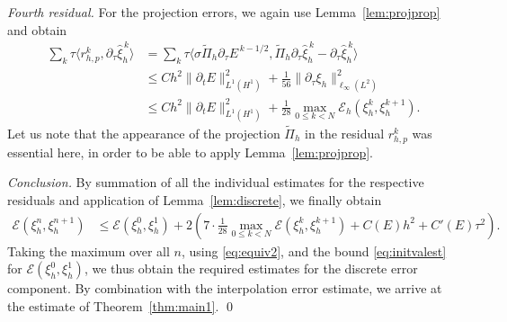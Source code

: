 \documentclass[12pt,reqno,a4paper]{amsart}
\theoremstyle{definition}
\def\EE{\mathscr{E}}
\def\dtau{\partial_{\tau}}
\def\dt{\partial_{t}}
\def\wPi{\widetilde\Pi}
\def\r{{r}}
\def\wh{\widehat}
\def\la{\langle}
\def\ra{\rangle}
\begin{document}
\medskip 
\noindent 
\textit{Fourth residual.}
For the projection errors, we again use Lemma~\ref{lem:projprop} and obtain
\begin{align*}
\sum\nolimits_k\tau\la\r_{h,p}^k,\dtau\wh\xi_h^{\,k}\ra
&= \sum\nolimits_k \tau \la\sigma \wPi_h \dtau E^{\,k-1/2},\wPi_h\dtau\wh\xi_h^{\,k}-\dtau\wh\xi_h^{\,k}\ra \\
&\le C h^2\|\dt E\|_{L^1(H^1)}^2 + \tfrac{1}{56}\|\dtau\xi_h\|^2_{\ell_\infty(L^2)} \\
&\le C h^2\|\dt E\|_{L^1(H^1)}^2 + \tfrac{1}{28}\max_{0\le k<N} \EE_h(\xi_h^k,\xi_h^{k+1}).
\end{align*}
Let us note that the appearance of the projection $\wPi_h$ in the residual $r_{h,p}^k$ was essential here, in order to be able to apply Lemma~\ref{lem:projprop}.

\medskip 
\noindent 
\textit{Conclusion.}
By summation of all the individual estimates for the respective residuals and application of Lemma~\ref{lem:discrete}, we finally obtain
\begin{align*}
\EE(\xi_h^n,\xi_h^{n+1})&\le \EE(\xi_h^0,\xi_h^{1}) + 2\left(7\cdot \tfrac{1}{28} \max_{0\le k < N} \EE(\xi_h^k,\xi_h^{k+1}) + C(E) h^2 + C'(E) \tau^2\right).
\end{align*}
Taking the maximum over all $n$, using \eqref{eq:equiv2}, and the bound \eqref{eq:initvalest} for $\EE(\xi_h^0,\xi_h^{1})$, we thus obtain the required estimates for the discrete error component. By combination with the interpolation error estimate, we arrive at the estimate of Theorem~\ref{thm:main1}.
\qed
\end{document}
